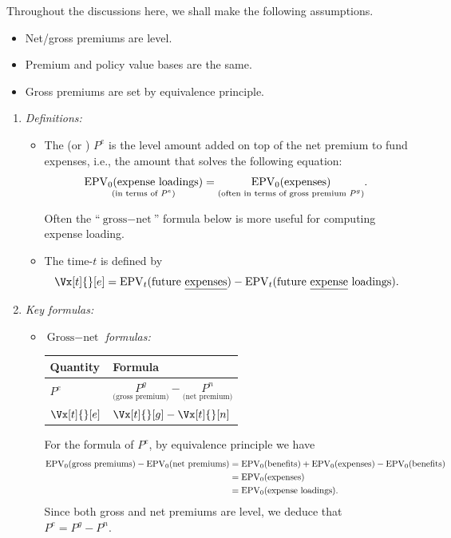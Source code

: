 \begin{enumerate}
Throughout the discussions here, we shall make the following assumptions.
\begin{itemize}
\item Net/gross premiums are level.
\item Premium and policy value bases are the same.
\item Gross premiums are set by equivalence principle.
\end{itemize}
\begin{enumerate}[label={(\arabic*)}]
\item \emph{Definitions:}
\begin{itemize}
\item The  (or ) \(P^e\) is the
level amount added on top of the net premium to fund expenses, i.e., the amount
that solves the following equation:
\[
\underset{\text{(in terms of \(P^e\))}}{\operatorname{EPV}_{0}(\text{expense loadings})}
=\underset{\text{(often in terms of gross premium \(P^g\))}}{\operatorname{EPV}_{0}(\text{expenses})}.
\]
\begin{note}
Often the ``\(\text{gross}-\text{net}\)'' formula below is more useful for
computing expense loading.
\end{note}
\item The time-\(t\)  is defined by
\[
\Vx[t]{}[e]=\epvt{t}{\text{future \underline{expenses}}}
-\epvt{t}{\text{future \underline{expense} loadings}}.
\]
\end{itemize}
\item \emph{Key formulas:}
\begin{itemize}
\item \emph{\(\text{Gross}-\text{net}\) formulas:}
\begin{center}
\begin{tabular}{ll}
\toprule
Quantity&Formula \\
\midrule
\(P^e\)&\(\underset{\text{(gross premium)}}{P^g}-\underset{\text{(net premium)}}{P^n}\) \\
\(\Vx[t]{}[e]\)&\(\Vx[t]{}[g]-\Vx[t]{}[n]\) \\
\bottomrule
\end{tabular}
\end{center}
\begin{pf}
For the formula of \(P^e\), by equivalence principle we have
\begin{align*}
\operatorname{EPV}_{0}(\text{gross premiums})
-\operatorname{EPV}_{0}(\text{net premiums})
&=\operatorname{EPV}_{0}(\text{benefits})+\operatorname{EPV}_{0}(\text{expenses})
-\operatorname{EPV}_{0}(\text{benefits}) \\
&=\operatorname{EPV}_{0}(\text{expenses}) \\
&=\operatorname{EPV}_{0}(\text{expense loadings}).
\end{align*}
Since both gross and net premiums are level, we deduce that \(P^e=P^g-P^n\).


\end{pf}
\end{itemize}
\end{enumerate}
\end{enumerate}
